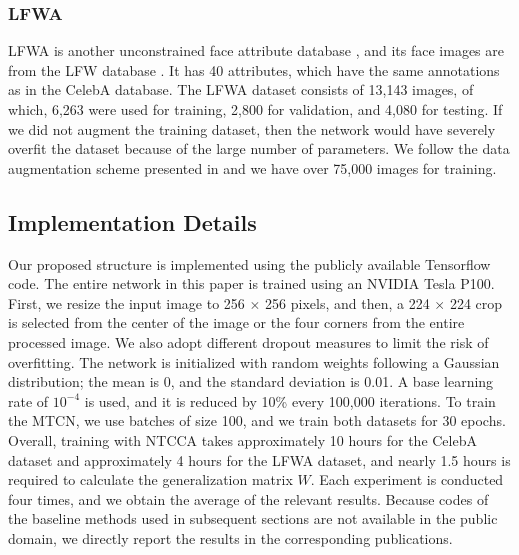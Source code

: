 \documentclass{sig-alternate-05-2015}
\begin{document}
\subsubsection{LFWA}
LFWA is another unconstrained face attribute database \cite{7410782}, and its face images are from the LFW database \cite{Huang2007Labeled}. It has 40 attributes, which have the same annotations as in the CelebA database. The LFWA dataset consists of 13,143 images, of which, 6,263 were used for training, 2,800 for validation, and 4,080 for testing. If we did not augment the training dataset, then the network would have severely overfit the dataset because of the large number of parameters. We follow the data augmentation scheme presented in \cite{hand2017attributes} and we have over 75,000 images for training.
\subsection{Implementation Details}
 Our proposed structure is implemented using the publicly available Tensorflow \cite{Abadi2016TensorFlow} code. The entire network in this paper is trained using an NVIDIA Tesla P100. First, we resize the input image to 256 $\times$ 256 pixels, and then, a 224 $\times$ 224 crop is selected from the center of the image or the four corners from the entire processed image. We also adopt different dropout measures to limit the risk of overfitting. The network is initialized with random weights following a Gaussian distribution; the mean is 0, and the standard deviation is 0.01. A base learning rate of $10^{-4}$ is used, and it is reduced by 10\% every 100,000 iterations. To train the MTCN, we use batches of size 100, and we train both datasets for 30 epochs. Overall, training with NTCCA takes approximately 10 hours for the CelebA dataset and approximately 4 hours for the LFWA dataset, and nearly 1.5 hours is required to calculate the generalization matrix $W$. Each experiment is conducted four times, and we obtain the average of the relevant results. Because codes of the baseline methods used in subsequent sections are not available in the public domain, we directly report the results in the corresponding publications.
\end{document}
